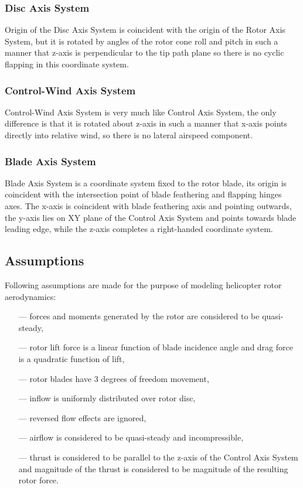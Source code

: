 \subsubsection{Disc Axis System}

Origin of the Disc Axis System is coincident with the origin of the Rotor Axis System, but it is rotated by angles of the rotor cone roll and pitch in such a manner that z-axis is perpendicular to the tip path plane so there is no cyclic flapping in this coordinate system.

\subsubsection{Control-Wind Axis System}

Control-Wind Axis System is very much like Control Axis System, the only difference is that it is rotated about z-axis in such a manner that x-axis points directly into relative wind, so there is no lateral airspeed component.

\subsubsection{Blade Axis System}

Blade Axis System is a coordinate system fixed to the rotor blade, its origin is coincident with the intersection point of blade feathering and flapping hinges axes. The x-axis is coincident with blade feathering axis and pointing outwards, the y-axis lies on XY plane of the Control Axis System and points towards blade leading edge, while the z-axis completes a right-handed coordinate system.

\subsection{Assumptions}

Following assumptions are made for the purpose of modeling helicopter rotor aerodynamics:
\begin{itemize}
  \item[---] forces and moments generated by the rotor are considered to be quasi-steady,
  \item[---] rotor lift force is a linear function of blade incidence angle and drag force is a quadratic function of lift, \cite{Padfield2007}
  \item[---] rotor blades have 3 degrees of freedom movement,
  \item[---] inflow is uniformly distributed over rotor disc, \cite{Padfield2007}
  \item[---] reversed flow effects are ignored,
  \item[---] airflow is considered to be quasi-steady and incompressible,
  \item[---] thrust is considered to be parallel to the z-axis of the Control Axis System and magnitude of the thrust is considered to be magnitude of the resulting rotor force. \cite{GessowMyers1985}
\end{itemize}

